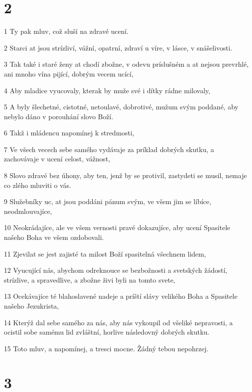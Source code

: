\chapter{2}

\par 1 Ty pak mluv, což sluší na zdravé ucení.
\par 2 Starci at jsou strízliví, vážní, opatrní, zdraví u víre, v lásce, v snášelivosti.
\par 3 Tak také i staré ženy at chodí zbožne, v odevu príslušném a at nejsou prevrhlé, ani mnoho vína pijící, dobrým vecem ucící,
\par 4 Aby mladice vyucovaly, kterak by muže své i dítky rádne milovaly,
\par 5 A byly šlechetné, cistotné, netoulavé, dobrotivé, mužum svým poddané, aby nebylo dáno v porouhání slovo Boží.
\par 6 Takž i mládencu napomínej k stredmosti,
\par 7 Ve všech vecech sebe samého vydávaje za príklad dobrých skutku, a zachovávaje v ucení celost, vážnost,
\par 8 Slovo zdravé bez úhony, aby ten, jenž by se protivil, zastydeti se musil, nemaje co zlého mluviti o vás.
\par 9 Služebníky uc, at jsou poddáni pánum svým, ve všem jim se líbíce, neodmlouvajíce,
\par 10 Neokrádajíce, ale ve všem vernosti pravé dokazujíce, aby ucení Spasitele našeho Boha ve všem ozdobovali.
\par 11 Zjevilat se jest zajisté ta milost Boží spasitelná všechnem lidem,
\par 12 Vyucující nás, abychom odreknouce se bezbožnosti a svetských žádostí, strízlive, a spravedlive, a zbožne živi byli na tomto svete,
\par 13 Ocekávajíce té blahoslavené nadeje a príští slávy velikého Boha a Spasitele našeho Jezukrista,
\par 14 Kterýž dal sebe samého za nás, aby nás vykoupil od všeliké nepravosti, a ocistil sobe samému lid zvláštní, horlive následovný dobrých skutku.
\par 15 Toto mluv, a napomínej, a tresci mocne. Žádný tebou nepohrzej.

\chapter{3}

